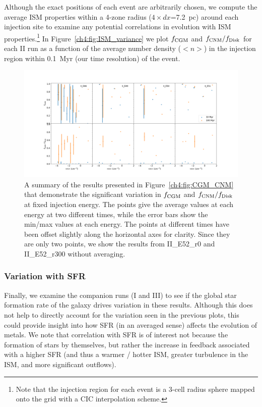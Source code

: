  Although the exact positions of each event are arbitrarily chosen, we compute the average ISM properties within a 4-zone radius ($4 \times dx$=7.2~pc) around each injection site to examine any potential correlations in evolution with ISM properties.\footnote{Note that the injection region for each event is a 3-cell radius sphere mapped onto the grid with a CIC interpolation scheme.} In Figure~\ref{ch4:fig:ISM_variance} we plot $f_{\rm CGM}$ and $f_{\rm CNM} / f_{\rm Disk}$ for each II run as a function of the average number density ($<n>$) in the injection region within 0.1~Myr (our time resolution) of the event.

 \begin{figure}
   \centering
   \includegraphics[width=0.95\linewidth]{figures/ch4/II_n_dependence}
   \caption{A summary of the results presented in Figure~\ref{ch4:fig:CGM_CNM} that demonstrate the significant variation in $f_{\rm CGM}$ and
   $f_{\rm CNM} / f_{\rm Disk}$ at fixed injection energy. The points give the average values at each energy at two different times, while the
   error bars show the min/max values at each energy. The points at different times have been offset slightly along the horizontal axes for clarity. Since they are only two points, we show the results from II_E52_r0 and II_E52_r300 without averaging.}
   \label{ch4:fig:CGM_CNM_variance}
 \end{figure}


\subsubsection{Variation with SFR}
\label{ch4:sec:SFR}

Finally, we examine the companion runs (I and III) to see if the global star formation rate of the galaxy drives variation in these results. Although this does not help to directly account for the variation seen in the previous plots, this could provide insight into how SFR (in an averaged sense) affects the evolution of metals. We note that correlation with SFR is of interest not because the formation of stars by themselves, but rather the increase in feedback associated with a higher SFR (and thus a warmer / hotter ISM, greater turbulence in the ISM, and more significant outflows).


